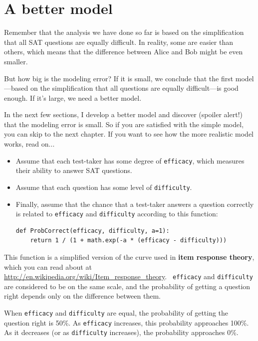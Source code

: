 \documentclass[12pt]{book}
\begin{document}
\section{A better model}

Remember that the analysis we have done so far is based on
the simplification that all SAT questions are equally difficult.
In reality, some are easier than others, which means that the
difference between Alice and Bob might be even smaller.

But how big is the modeling error?  If it is small, we conclude
that the first model---based on the simplification that all questions
are equally difficult---is good enough.  If it's large,
we need a better model.

In the next few sections, I develop a better model and 
discover (spoiler alert!) that the modeling error is small.  So if
you are satisfied with the simple model, you can skip to the next
chapter.  If you want to see how the more realistic model works,
read on...

\begin{itemize}

\item Assume that each test-taker has some 
  degree of {\tt efficacy}, which measures their
  ability to answer SAT questions.

\item Assume that each question has some level of
  {\tt difficulty}.

\item Finally, assume that the chance that a test-taker answers a
  question correctly is related to {\tt efficacy} and {\tt difficulty}
  according to this function:

\begin{verbatim}
def ProbCorrect(efficacy, difficulty, a=1):
    return 1 / (1 + math.exp(-a * (efficacy - difficulty)))
\end{verbatim}

\end{itemize}

This function is a simplified version of the curve used in {\bf item
response theory}, which you can read about at
\url{http://en.wikipedia.org/wiki/Item_response_theory}.  {\tt
  efficacy} and {\tt difficulty} are considered to be on the same
scale, and the probability of getting a question right depends only on
the difference between them.

When {\tt efficacy} and {\tt difficulty} are equal, the
probability of getting the question right is 50\%.  As
{\tt efficacy} increases, this probability approaches 100\%.
As it decreases (or as {\tt difficulty} increases), the
probability approaches 0\%.
\end{document}
